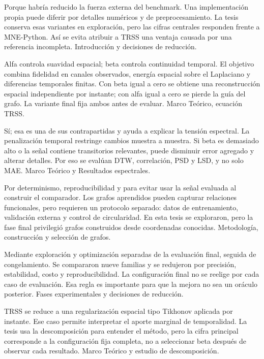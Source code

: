 {Porque habría reducido la fuerza externa del benchmark.}
{Una implementación propia puede diferir por detalles numéricos y de preprocesamiento. La tesis conserva esas variantes en exploración, pero las cifras centrales responden frente a MNE-Python. Así se evita atribuir a TRSS una ventaja causada por una referencia incompleta.}
{Introducción y decisiones de reducción.}

{Alfa controla suavidad espacial; beta controla continuidad temporal.}
{El objetivo combina fidelidad en canales observados, energía espacial sobre el Laplaciano y diferencias temporales finitas. Con beta igual a cero se obtiene una reconstrucción espacial independiente por instante; con alfa igual a cero se pierde la guía del grafo. La variante final fija ambos antes de evaluar.}
{Marco Teórico, ecuación TRSS.}

{Sí; esa es una de sus contrapartidas y ayuda a explicar la tensión espectral.}
{La penalización temporal restringe cambios muestra a muestra. Si beta es demasiado alto o la señal contiene transitorios relevantes, puede disminuir error agregado y alterar detalles. Por eso se evalúan DTW, correlación, PSD y LSD, y no solo MAE.}
{Marco Teórico y Resultados espectrales.}

{Por determinismo, reproducibilidad y para evitar usar la señal evaluada al construir el comparador.}
{Los grafos aprendidos pueden capturar relaciones funcionales, pero requieren un protocolo separado: datos de entrenamiento, validación externa y control de circularidad. En esta tesis se exploraron, pero la fase final privilegió grafos construidos desde coordenadas conocidas.}
{Metodología, construcción y selección de grafos.}

{Mediante exploración y optimización separadas de la evaluación final, seguida de congelamiento.}
{Se compararon nueve familias y se redujeron por precisión, estabilidad, costo y reproducibilidad. La configuración final no se reelige por cada caso de evaluación. Esa regla es importante para que la mejora no sea un oráculo posterior.}
{Fases experimentales y decisiones de reducción.}

{TRSS se reduce a una regularización espacial tipo Tikhonov aplicada por instante.}
{Ese caso permite interpretar el aporte marginal de temporalidad. La tesis usa la descomposición para entender el método, pero la cifra principal corresponde a la configuración fija completa, no a seleccionar beta después de observar cada resultado.}
{Marco Teórico y estudio de descomposición.}

